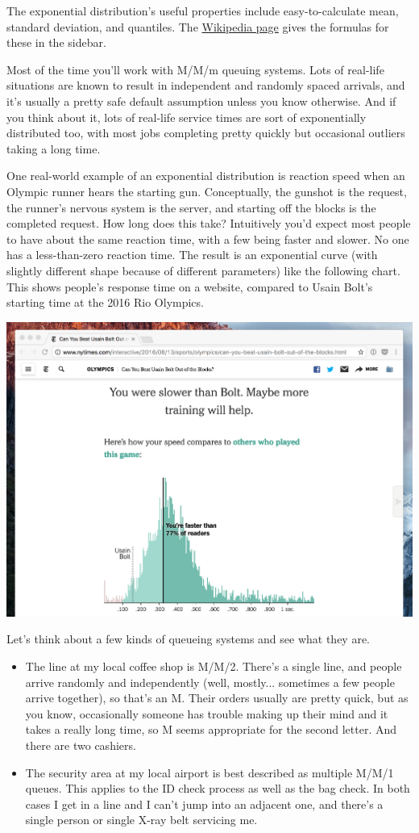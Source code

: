 \documentclass{vivid_layout}
\begin{document}
The exponential distribution's useful properties include easy-to-calculate mean,
standard deviation, and quantiles. The
\href{https://en.wikipedia.org/wiki/Exponential\_distribution}{Wikipedia page}
gives the formulas for these in the sidebar.

Most of the time you'll work with M/M/m queuing systems. Lots of real-life situations are known to result in independent and randomly spaced arrivals, and it's usually a pretty safe default assumption unless you know otherwise. And if you think about it, lots of real-life service times are sort of exponentially distributed too, with most jobs completing pretty quickly but occasional outliers taking a long time.

One real-world example of an exponential distribution is reaction speed when an
Olympic runner hears the starting gun. Conceptually, the gunshot is the request,
the runner's nervous system is the server, and starting off the blocks is the
completed request. How long does this take? Intuitively you'd expect most people
to have about the same reaction time, with a few being faster and slower. No one
has a less-than-zero reaction time. The result is an exponential curve (with
slightly different shape because of different parameters) like the following
chart. This shows people's response time on a website, compared to Usain Bolt's
starting time at the 2016 Rio Olympics.

\begin{center}
\includegraphics[width=.75\linewidth]{queueing-theory/bolt}
\end{center}

Let's think about a few kinds of queueing systems and see what they are.

\begin{itemize}
\item The line at my local coffee shop is M/M/2. There's a single line, and people arrive randomly and independently (well, mostly... sometimes a few people arrive together), so that's an M. Their orders usually are pretty quick, but as you know, occasionally someone has trouble making up their mind and it takes a really long time, so M seems appropriate for the second letter. And there are two cashiers.
\item The security area at my local airport is best described as multiple M/M/1 queues. This applies to the ID check process as well as the bag check. In both cases I get in a line and I can't jump into an adjacent one, and there's a single person or single X-ray belt servicing me.
\end{itemize}
\end{document}

